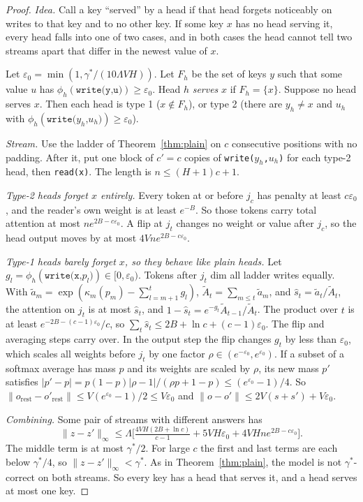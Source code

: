 \documentclass[10pt]{article}
\theoremstyle{definition}
\theoremstyle{remark}
\newcommand{\shat}{\hat{s}}
\begin{document}
\begin{proof}
\emph{Idea.} Call a key ``served'' by a head if that head forgets noticeably on writes to that key and to no other key. If some key $x$ has no head serving it, every head falls into one of two cases, and in both cases the head cannot tell two streams apart that differ in the newest value of $x$.

Let $\varepsilon_0 = \min(1, \gamma^*/(10\Lambda V H))$. Let $F_h$ be the set of keys $y$ such that some value $u$ has $\phi_h(\texttt{write(y,u)}) \ge \varepsilon_0$. Head $h$ \emph{serves} $x$ if $F_h = \{x\}$. Suppose no head serves $x$. Then each head is type 1 ($x \notin F_h$), or type 2 (there are $y_h \ne x$ and $u_h$ with $\phi_h(\texttt{write($y_h$,$u_h$)}) \ge \varepsilon_0$).

\emph{Stream.} Use the ladder of Theorem~\ref{thm:plain} on $c$ consecutive positions with no padding. After it, put one block of $c' = c$ copies of \texttt{write($y_h$,$u_h$)} for each type-2 head, then \texttt{read(x)}. The length is $n \le (H+1)c + 1$.

\emph{Type-2 heads forget $x$ entirely.} Every token at or before $j_c$ has penalty at least $c\varepsilon_0$, and the reader's own weight is at least $e^{-B}$. So those tokens carry total attention at most $n e^{2B - c\varepsilon_0}$. A flip at $j_t$ changes no weight or value after $j_c$, so the head output moves by at most $4Vn e^{2B - c\varepsilon_0}$.

\emph{Type-1 heads barely forget $x$, so they behave like plain heads.} Let $g_l = \phi_h(\texttt{write(x,$p_l$)}) \in [0, \varepsilon_0)$. Tokens after $j_t$ dim all ladder writes equally. With $\tilde a_m = \exp(\kappa_m(p_m) - \sum_{l=m+1}^{t} g_l)$, $\tilde A_t = \sum_{m \le t} \tilde a_m$, and $\shat_t = \tilde a_t / \tilde A_t$, the attention on $j_t$ is at most $\shat_t$, and $1 - \shat_t = e^{-g_t} \tilde A_{t-1}/\tilde A_t$. The product over $t$ is at least $e^{-2B - (c-1)\varepsilon_0}/c$, so $\sum_t \shat_t \le 2B + \ln c + (c-1)\varepsilon_0$. The flip and averaging steps carry over. In the output step the flip changes $g_t$ by less than $\varepsilon_0$, which scales all weights before $j_t$ by one factor $\rho \in (e^{-\varepsilon_0}, e^{\varepsilon_0})$. If a subset of a softmax average has mass $p$ and its weights are scaled by $\rho$, its new mass $p'$ satisfies $|p' - p| = p(1-p)|\rho - 1|/(\rho p + 1 - p) \le (e^{\varepsilon_0} - 1)/4$. So $\|o_{\mathrm{rest}} - o'_{\mathrm{rest}}\| \le V(e^{\varepsilon_0} - 1)/2 \le V\varepsilon_0$ and $\|o - o'\| \le 2V(s + s') + V\varepsilon_0$.

\emph{Combining.} Some pair of streams with different answers has
\[
\|z - z'\|_\infty \le \Lambda \Big[ \tfrac{4VH(2B + \ln c)}{c-1} + 5VH\varepsilon_0 + 4VHn e^{2B - c\varepsilon_0} \Big].
\]
The middle term is at most $\gamma^*/2$. For large $c$ the first and last terms are each below $\gamma^*/4$, so $\|z - z'\|_\infty < \gamma^*$. As in Theorem~\ref{thm:plain}, the model is not $\gamma^*$-correct on both streams. So every key has a head that serves it, and a head serves at most one key.
\end{proof}
\end{document}

